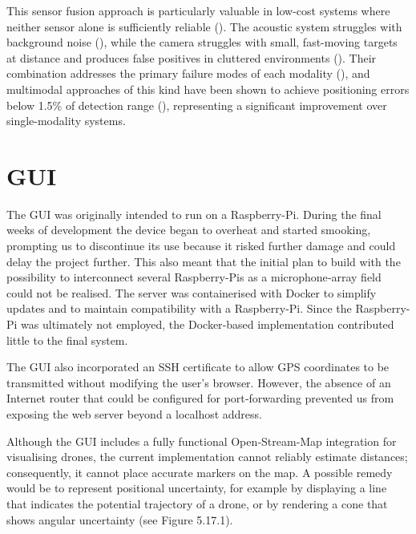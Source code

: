 This sensor fusion approach is particularly valuable in low-cost systems where 
neither sensor alone is sufficiently reliable (\cite{macedo2025drone}). The 
acoustic system struggles with background noise 
(\cite{macedo2025drone, seidaliyeva2024advances}), while the camera struggles 
with small, fast-moving targets at distance and produces false positives in 
cluttered environments (\cite{macedo2025drone}). Their combination addresses 
the primary failure modes of each modality 
(\cite{seidaliyeva2024advances, macedo2025drone}), and multimodal approaches 
of this kind have been shown to achieve positioning errors below 1.5\% of 
detection range (\cite{ding2023drone}), representing a significant improvement 
over single-modality systems.

\section{GUI}
The GUI was originally intended to run on a Raspberry-Pi. During the final weeks of development the device began to overheat and started smooking, prompting us to discontinue its use because it risked further damage and could delay the project further. This also meant that the initial plan to build with the possibility to interconnect several Raspberry-Pis as a microphone‑array field could not be realised.
The server was containerised with Docker to simplify updates and to maintain compatibility with a Raspberry-Pi. Since the Raspberry-Pi was ultimately not employed, the Docker‑based implementation contributed little to the final system.

\vspace{1em}

The GUI also incorporated an SSH certificate to allow GPS coordinates to be transmitted without modifying the user’s browser. However, the absence of an Internet router that could be configured for port‑forwarding prevented us from exposing the web server beyond a localhost address.

\vspace{1em}

Although the GUI includes a fully functional Open‑Stream‑Map integration for visualising drones, the current implementation cannot reliably estimate distances; consequently, it cannot place accurate markers on the map. A possible remedy would be to represent positional uncertainty, for example by displaying a line that indicates the potential trajectory of a drone, or by rendering a cone that shows angular uncertainty (see Figure 5.17.1).


